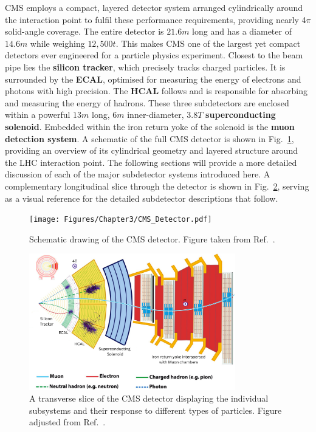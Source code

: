 CMS employs a compact, layered detector system arranged cylindrically around the interaction point to fulfil these performance requirements, providing nearly 4$\pi$ solid-angle coverage. The entire detector is $21.6\unit{m}$ long and has a diameter of $14.6\unit{m}$ while weighing $12,500\unit{t}$. This makes CMS one of the largest yet compact detectors ever engineered for a particle physics experiment. Closest to the beam pipe lies the \textbf{silicon tracker}, which precisely tracks charged particles. It is surrounded by the \textbf{\ac{ECAL}}, optimised for measuring the energy of electrons and photons with high precision. The \textbf{\ac{HCAL}} follows and is responsible for absorbing and measuring the energy of hadrons. These three subdetectors are enclosed within a powerful $13\unit{m}$ long, $6\unit{m}$ inner-diameter, $3.8\unit{T}$ \textbf{superconducting solenoid}. Embedded within the iron return yoke of the solenoid is the \textbf{muon detection system}. A schematic of the full CMS detector is shown in Fig.~\ref{Figure:Chapter3_CMS_schematic}, providing an overview of its cylindrical geometry and layered structure around the LHC interaction point. The following sections will provide a more detailed discussion of each of the major subdetector systems introduced here. A complementary longitudinal slice through the detector is shown in Fig.~\ref{Figure:Chapter3_CMS_slice}, serving as a visual reference for the detailed subdetector descriptions that follow.

\begin{figure}[h]
\centering
\texttt{[image: Figures/Chapter3/CMS\_Detector.pdf]}
\caption[Schematic drawing of the CMS detector]{Schematic drawing of the CMS detector. Figure taken from Ref.~\cite{CMS_Detector_Run3}.}
\label{Figure:Chapter3_CMS_schematic}
\end{figure}

\begin{figure}[h]
\centering
\includegraphics[width= 0.8\textwidth]{Figures/Chapter3/CMS_Detector_Slice.pdf}
\caption[Transverse slice of the CMS detector]{A transverse slice of the CMS detector displaying the individual subsystems and their response to different types of particles. Figure adjusted from Ref.~\cite{CMS_Detector_Slice}.}
\label{Figure:Chapter3_CMS_slice}
\end{figure}

